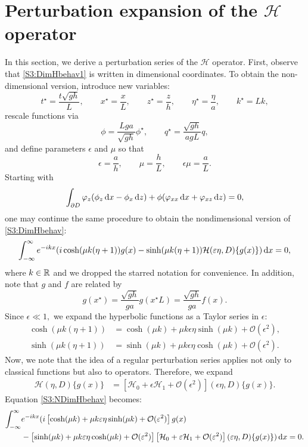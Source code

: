 \section{Perturbation expansion of the $\mathcal{H}$ operator}
In this section, we derive a perturbation series of the $\mathcal{H}$ operator. First, observe that \eqref{S3:DimHbehav1} is written in dimensional coordinates. To obtain the non-dimensional version, introduce new variables: 
\[ 
t^{\star} = \frac{t \sqrt{gh}}{L}, \qquad x^{\star}  = \frac{x}{L}, \qquad z^{\star}  = \frac{z}{h}, \qquad \eta^{\star}  = \frac{\eta}{a}, \qquad k^{\star}  = Lk, \]
rescale functions via
\[ \phi = \frac{Lga}{\sqrt{gh}} \phi^{\star}, \qquad q^{\star}  = \frac{\sqrt{gh}}{agL} q,\]
and define parameters $\epsilon$ and $\mu$ so that
\[ 
\epsilon = \frac{a}{h}, \qquad \mu = \frac{h}{L}, \qquad \epsilon \mu = \frac{a}{L}.
\] 
Starting with 
\begin{equation*}
\int_{\partial D} \varphi_z(\phi_z \,\mathrm{d} x - \phi_x \,\mathrm{d} z) + \phi(\varphi_{xx} \,\mathrm{d} x + \varphi_{xz} \,\mathrm{d} z) = 0,
\end{equation*}
one may continue the same procedure to obtain the nondimensional version of \eqref{S3:DimHbehav}:
\begin{equation}\label{S3:NDimHbehav}
\int_{-\infty}^{\infty} e^{-ikx}( i  \cosh(\mu k(\eta+1)) g(x) - \sinh(\mu k(\eta+1)) \mathcal{H}( \varepsilon \eta, D)\{ g(x) \}) \,\mathrm{d} x = 0, 
\end{equation}
where $k \in \mathbb R$ and we dropped the starred notation for convenience. In addition, note that $g$ and $f$ are related by 
\[ g(x^{\star}) = \frac{\sqrt{gh}}{ga}g(x^{\star}L) = \frac{\sqrt{gh}}{ga}f(x).
\]
Since $\epsilon \ll 1,$ we expand the hyperbolic functions as a Taylor series in $\epsilon:$
\begin{align*}
\cosh(\mu k(\eta+1)) &= \cosh(\mu k) + \mu k \epsilon \eta \sinh(\mu k) + \mathcal{O}(\epsilon^2), \\
\sinh(\mu k(\eta+1)) &= \sinh(\mu k) + \mu k \epsilon \eta \cosh(\mu k) + \mathcal{O}(\epsilon^2).
\end{align*}
Now, we note that the idea of a regular perturbation series applies not only to classical functions but also to operators. Therefore, we expand
\begin{align*}
\mathcal{H}( \eta, D)\{ g(x) \} &= \left[\mathcal{H}_0 + \epsilon \mathcal{H}_1 + \mathcal{O}(\epsilon^2) \right]( \epsilon\eta, D)\{ g(x) \}.
\end{align*}
Equation \eqref{S3:NDimHbehav} becomes:
\begin{equation}\label{S3:HPerturbed}
\begin{aligned}
\int_{-\infty}^{\infty} &e^{-ikx}( i \left[ \cosh(\mu k) + \mu k \varepsilon \eta \sinh(\mu k) + \mathcal{O}(\varepsilon^2) \right] g(x) \\
&- \left[ \sinh(\mu k) + \mu k \varepsilon \eta \cosh(\mu k) + \mathcal{O}(\varepsilon^2)\right] \left[ \mathcal{H}_0 + \varepsilon \mathcal{H}_1 + \mathcal{O}(\varepsilon^2) \right]( \varepsilon \eta, D)\{ g(x) \}) \,\mathrm{d} x = 0.
\end{aligned}
\end{equation}
